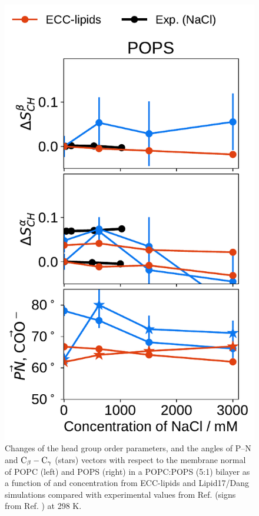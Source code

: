 \documentclass[journal=jpcbfk,manuscript=article]{achemso}
\newlength{\figheightsmall}
\newlength{\figheight}
\begin{document}
\begin{figure}[tbp!]
  \includegraphics[height=\figheightsmall]{../img/ecc_pops/order_parameters_changes_ecc-lip_L14_A-B-PN-COO_POPS_nacl.pdf} 
  \caption{\label{fig:delta_ordPar_monoval_PCPS}
    Changes of the head group order parameters, and the angles of P--N and ${\rm{C}}_\beta-{\rm{C}}_\gamma$ (stars) vectors
    with respect to the membrane normal of POPC (left) and POPS (right) in a POPC:POPS (5:1) bilayer 
    as a function of  and  concentration from ECC-lipids and Lipid17/Dang simulations 
    compared with experimental values from Ref.  (signs from Ref. ) at 298 K.
}
\end{figure}
\end{document}
